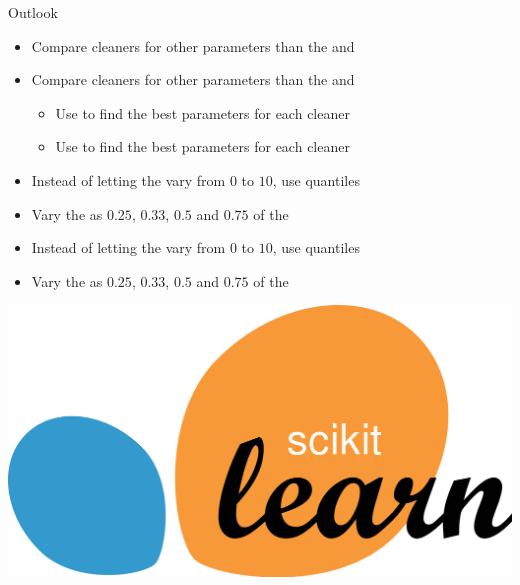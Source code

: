 
\begin{frame}{Outlook}
    \begin{minipage}{0.7\textwidth}
        \begin{itemize}
            \ifdefined\darktheme
                \item Compare cleaners for other parameters than the  and 
            \else
                \item Compare cleaners for other parameters than the  and 
            \fi
            \begin{itemize}
                \ifdefined\darktheme
                    \item [\rightarrow] Use  to find the best parameters for each cleaner
                \else
                    \item [\rightarrow] Use  to find the best parameters for each cleaner
                \fi
            \end{itemize}
            \ifdefined\darktheme
                \item Instead of letting the  vary from \(\num{0}\) to \(\num{10}\), use quantiles
                \item Vary the  as \(\num{0.25}\), \(\num{0.33}\), \(\num{0.5}\) and \(\num{0.75}\) of the 
            \else
                \item Instead of letting the  vary from \(\num{0}\) to \(\num{10}\), use quantiles
                \item Vary the  as \(\num{0.25}\), \(\num{0.33}\), \(\num{0.5}\) and \(\num{0.75}\) of the 
            \fi
        \end{itemize}
    \end{minipage}
    \begin{minipage}{0.28\textwidth}
        \includegraphics[width=\textwidth]{logos/sklearn.png}
    \end{minipage}
\end{frame}

